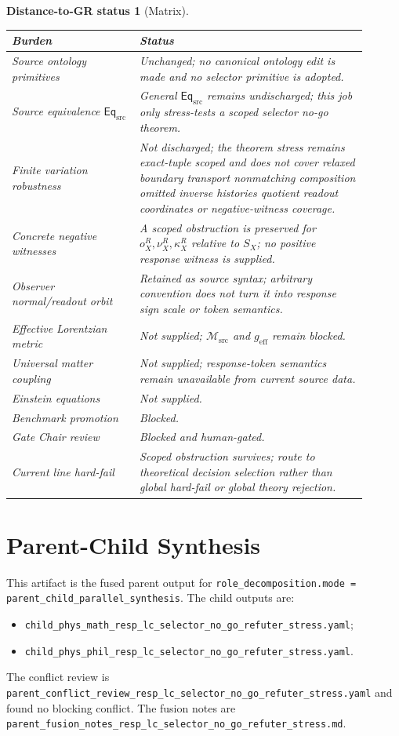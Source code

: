 \documentclass[11pt]{article}
\newcommand{\EqSrc}{\mathsf{Eq}_{\mathrm{src}}}
\newcommand{\Msrc}{\mathcal{M}_{\mathrm{src}}}
\newcommand{\geff}{g_{\mathrm{eff}}}
\newtheorem{distancestatus}{Distance-to-GR status}
\begin{document}
\begin{distancestatus}[Matrix]
\begin{center}
\small
\begin{tabular}{p{0.32\linewidth}p{0.58\linewidth}}
\hline
\textbf{Burden} & \textbf{Status} \\
\hline
Source ontology primitives & Unchanged; no canonical ontology edit is made and no selector primitive is adopted. \\
Source equivalence \(\EqSrc\) & General \(\EqSrc\) remains undischarged; this job only stress-tests a scoped selector no-go theorem. \\
Finite variation robustness & Not discharged; the theorem stress remains exact-tuple scoped and does not cover relaxed boundary transport nonmatching composition omitted inverse histories quotient readout coordinates or negative-witness coverage. \\
Concrete negative witnesses & A scoped obstruction is preserved for \(o^R_X,\nu^R_X,\kappa^R_X\) relative to \(S_X\); no positive response witness is supplied. \\
Observer normal/readout orbit & Retained as source syntax; arbitrary convention does not turn it into response sign scale or token semantics. \\
Effective Lorentzian metric & Not supplied; \(\Msrc\) and \(\geff\) remain blocked. \\
Universal matter coupling & Not supplied; response-token semantics remain unavailable from current source data. \\
Einstein equations & Not supplied. \\
Benchmark promotion & Blocked. \\
Gate Chair review & Blocked and human-gated. \\
Current line hard-fail & Scoped obstruction survives; route to theoretical decision selection rather than global hard-fail or global theory rejection. \\
\hline
\end{tabular}
\end{center}
\end{distancestatus}

\section{Parent-Child Synthesis}

This artifact is the fused parent output for
\texttt{role\_decomposition.mode = parent\_child\_parallel\_synthesis}.
The child outputs are:
\begin{itemize}
    \item \texttt{child\_phys\_math\_resp\_lc\_selector\_no\_go\_refuter\_stress.yaml};
    \item \texttt{child\_phys\_phil\_resp\_lc\_selector\_no\_go\_refuter\_stress.yaml}.
\end{itemize}
The conflict review is
\texttt{parent\_conflict\_review\_resp\_lc\_selector\_no\_go\_refuter\_stress.yaml}
and found no blocking conflict. The fusion notes are
\texttt{parent\_fusion\_notes\_resp\_lc\_selector\_no\_go\_refuter\_stress.md}.
\end{document}
